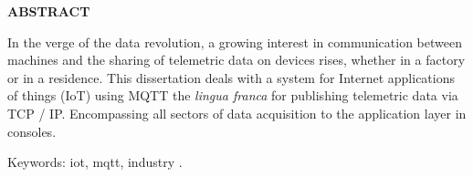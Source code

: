 \begin{center}
\textbf{ABSTRACT}
\end{center}

$\!$\\


In the verge of the data revolution, a growing interest in communication between machines and the sharing of telemetric data on devices rises, whether in a factory or in a residence. This dissertation deals with a system for Internet applications of things (IoT) using MQTT the \textit{lingua franca} for publishing telemetric data via TCP / IP. Encompassing all sectors of data acquisition to the application layer in consoles.

\vspace{1cm}

\hspace{-1.3cm}Keywords: iot, mqtt, industry .